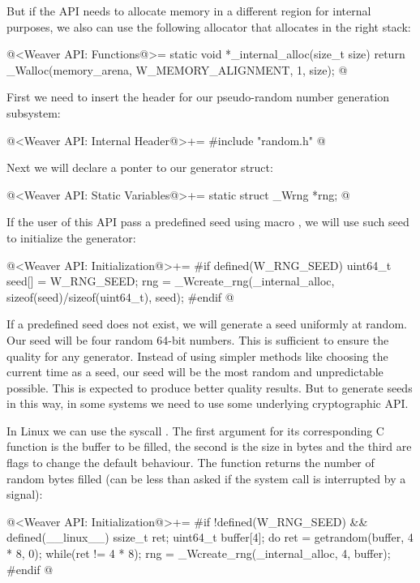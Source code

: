 But if the API needs to allocate memory in a different region for
internal purposes, we also can use the following allocator that
allocates in the right stack:

\iniciocodigo
@<Weaver API: Functions@>=
static void *_internal_alloc(size_t size){
  return _Walloc(memory_arena, W_MEMORY_ALIGNMENT, 1, size);
}
@
\fimcodigo


First we need to insert the header for our pseudo-random number
generation subsystem:

\iniciocodigo
@<Weaver API: Internal Header@>+=
#include "random.h"
@
\fimcodigo

Next we will declare a ponter to our generator struct:

\iniciocodigo
@<Weaver API: Static Variables@>+=
static struct _Wrng *rng;
@
\fimcodigo

If the user of this API pass a predefined seed using
macro , we will use such seed to initialize the
generator:

\iniciocodigo
@<Weaver API: Initialization@>+=
#if defined(W_RNG_SEED)
{
  uint64_t seed[] = W_RNG_SEED;
  rng = _Wcreate_rng(_internal_alloc, sizeof(seed)/sizeof(uint64_t),
                     seed);
}
#endif
@
\fimcodigo

If a predefined seed does not exist, we will generate a seed uniformly
at random. Our seed will be four random 64-bit numbers. This is
sufficient to ensure the quality for any generator. Instead of using
simpler methods like choosing the current time as a seed, our seed
will be the most random and unpredictable possible. This is expected
to produce better quality results. But to generate seeds in this way,
in some systems we need to use some underlying cryptographic API.

In Linux we can use the syscall . The first
argument for its corresponding C function is the buffer to be filled,
the second is the size in bytes and the third are flags to change the
default behaviour. The function returns the number of random bytes
filled (can be less than asked if the system call is interrupted by a
signal):

\iniciocodigo
@<Weaver API: Initialization@>+=
#if !defined(W_RNG_SEED) && defined(__linux__)
{
  ssize_t ret;
  uint64_t buffer[4];
  do{
    ret = getrandom(buffer, 4 * 8, 0);
  }while(ret != 4 * 8);
  rng = _Wcreate_rng(_internal_alloc, 4, buffer);
}
#endif
@
\fimcodigo

